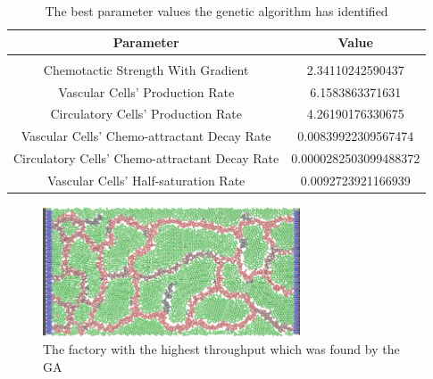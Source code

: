 \begin{table}[!t]
\renewcommand{\arraystretch}{1.3}
\caption{The best parameter values the genetic algorithm has identified}
\label{parameter_table}
\centering
\begin{tabular}{c||c}
\hline
\bfseries Parameter & \bfseries Value\\
\hline\hline
\\
\hline
Chemotactic Strength With Gradient & 2.34110242590437\\
\hline
Vascular Cells' Production Rate & 6.1583863371631\\
\hline
Circulatory Cells' Production Rate & 4.26190176330675\\
\hline
Vascular Cells' Chemo-attractant Decay Rate & 0.00839922309567474\\
\hline
Circulatory Cells' Chemo-attractant Decay Rate & 0.0000282503099488372\\
\hline
Vascular Cells' Half-saturation Rate & 0.0092723921166939\\
\hline
\end{tabular}
\end{table}

\begin{figure}[!t]
\centering
\includegraphics[width=3in]{./figures/sima/results/highest product factory.png}

\caption{The factory with the highest throughput which was found by the GA}
\label{factory}
\end{figure}   